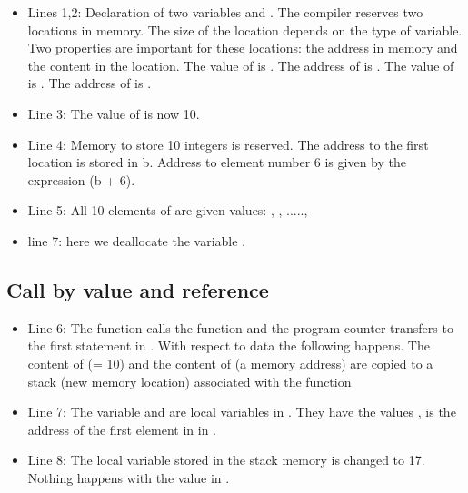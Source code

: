 \documentclass[%
twoside,                 %
final,                   %
10pt]{article}
\begin{document}
{{{{{\begin{itemize}
  \item Lines 1,2: Declaration of two variables  and . The compiler reserves two locations in memory. The size of the location depends on the type of variable. Two properties are important for these locations: the address in memory and the content in the location. The value of  is . The address of  is . The value of  is . The address of  is .

  \item Line 3: The value of  is now 10.

  \item Line 4: Memory to store 10 integers is reserved. The address to the first location is stored in b. Address to element number 6 is given by the expression (b + 6).

  \item Line 5: All 10 elements of  are given values: , , ....., 

  \item line 7: here we deallocate the variable .
\end{itemize}

\noindent
\subsection{Call by value and reference}

\begin{itemize}
  \item Line 6: The  function calls the function  and the program counter transfers to the first statement in . With respect to data the following happens. The content of  (= 10) and the content of  (a memory address) are copied to a stack (new memory location) associated with the function 

  \item Line 7: The variable  and  are local variables in . They have the values  ,  is the address of the first element in  in .

  \item Line 8: The local variable  stored in the stack memory is changed to 17. Nothing happens with the value  in .
\end{itemize}

}}}}}
\end{document}
